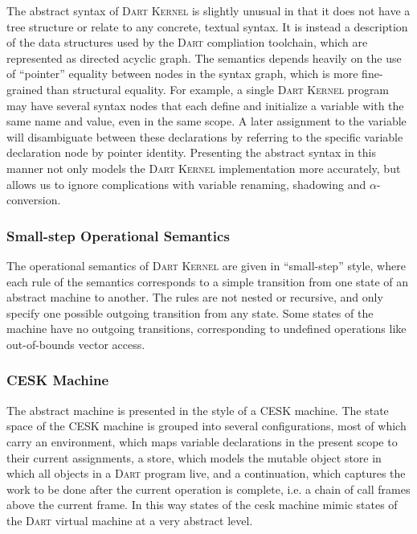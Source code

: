 \documentclass[a4paper,oneside]{article}
\newcommand{\kernel}{\textsc{Dart Kernel}}
\newcommand{\dart}{\textsc{Dart}}
\begin{document}
The abstract syntax of \kernel{} is slightly unusual in that it does not have a tree structure or relate to any concrete, textual syntax.
It is instead a description of the data structures used by the \dart{} compliation toolchain, which are represented as directed acyclic graph.
The semantics depends heavily on the use of ``pointer'' equality between nodes in the syntax graph, which is more fine-grained than structural equality.
For example, a single \kernel{} program may have several syntax nodes that each define and initialize a variable with the same name and value, even in the same scope.
A later assignment to the variable will disambiguate between these declarations by referring to the specific variable declaration node by pointer identity.
Presenting the abstract syntax in this manner not only models the \kernel{} implementation more accurately, but allows us to ignore complications with variable renaming, shadowing and $\alpha$-conversion.

\subsubsection{Small-step Operational Semantics}

The operational semantics of \kernel{} are given in ``small-step'' style, where each rule of the semantics corresponds to a simple transition from one state of an abstract machine to another.
The rules are not nested or recursive, and only specify one possible outgoing transition from any state.
Some states of the machine have no outgoing transitions, corresponding to undefined operations like out-of-bounds vector access.

\subsubsection{CESK Machine}

The abstract machine is presented in the style of a CESK machine. 
The state space of the CESK machine is grouped into several configurations, most of which carry an environment, which maps variable declarations in the present scope to their current assignments, a store, which models the mutable object store in which all objects in a \dart{} program live, and a continuation, which captures the work to be done after the current operation is complete, i.e. a chain of call frames above the current frame.
In this way states of the cesk machine mimic states of the \dart{} virtual machine at a very abstract level.
\end{document}
